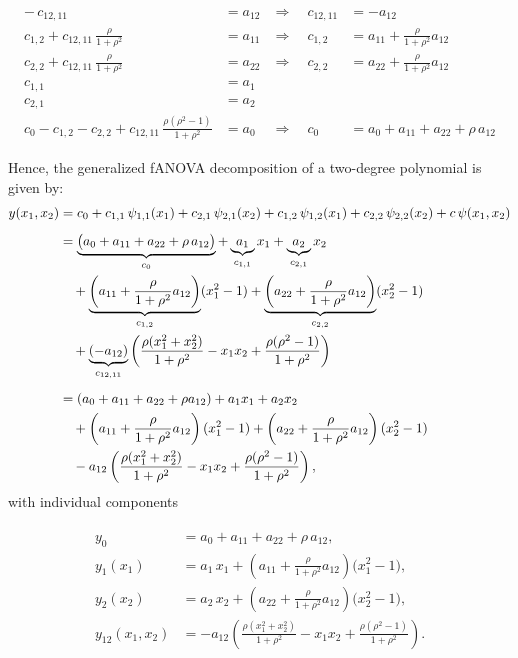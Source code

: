 \begin{align*}
-\,c_{12, 11} &= a_{12} &\Rightarrow\quad c_{12, 11} &= -a_{12} \\[3pt]
c_{1,2} + c_{12, 11}\,\tfrac{\rho}{1+\rho^2} &= a_{11} 
&\Rightarrow\quad c_{1,2} &= a_{11} + \tfrac{\rho}{1+\rho^2}a_{12} \\[3pt]
c_{2,2} + c_{12, 11}\,\tfrac{\rho}{1+\rho^2} &= a_{22} 
&\Rightarrow\quad c_{2,2} &= a_{22} + \tfrac{\rho}{1+\rho^2}a_{12} \\[3pt]
c_{1,1} &= a_1 \\[3pt]
c_{2,1} &= a_2 \\[3pt]
c_0 - c_{1,2} - c_{2,2} + c_{12, 11}\,\tfrac{\rho(\rho^2 - 1)}{1+\rho^2} &= a_0 
&\Rightarrow\quad 
c_0 &= a_0 + a_{11} + a_{22} + \rho\,a_{12}
\end{align*}

Hence, the generalized fANOVA decomposition of a two-degree polynomial is given by:
\begin{align*}
y(x_1,x_2) 
&= c_0 
  + c_{1,1}\,\psi_{1,1}(x_1) 
  + c_{2,1}\,\psi_{2,1}(x_2)
  + c_{1,2}\,\psi_{1,2}(x_1)
  + c_{2,2}\,\psi_{2,2}(x_2)
  + c\,\psi(x_1,x_2) \\[5pt]
&= 
\underbrace{\big(a_0 + a_{11} + a_{22} + \rho\,a_{12}\big)}_{c_0} 
+ \underbrace{a_1}_{c_{1,1}} x_1
+ \underbrace{a_2}_{c_{2,1}} x_2 \\ 
&\quad 
+ \underbrace{\left(a_{11} + \frac{\rho}{1+\rho^2}a_{12}\right)}_{c_{1,2}} (x_1^2 - 1)
+ \underbrace{\left(a_{22} + \frac{\rho}{1+\rho^2}a_{12}\right)}_{c_{2,2}} (x_2^2 - 1) \notag \\
&\quad 
+ \underbrace{(-a_{12})}_{c_{12, 11}}\left(
    \frac{\rho(x_1^2+x_2^2)}{1+\rho^2} - x_1 x_2 
    + \frac{\rho(\rho^2-1)}{1+\rho^2}
  \right) \\[5pt]
&= 
(a_0 + a_{11} + a_{22} + \rho a_{12})
+ a_1 x_1
+ a_2 x_2 \notag \\ 
&\quad 
+ \left(a_{11} + \frac{\rho}{1+\rho^2} a_{12}\right)(x_1^2 - 1)
+ \left(a_{22} + \frac{\rho}{1+\rho^2} a_{12}\right)(x_2^2 - 1) \notag \\
&\quad 
- a_{12}\left(
  \frac{\rho(x_1^2 + x_2^2)}{1+\rho^2}
  - x_1 x_2
  + \frac{\rho(\rho^2 - 1)}{1+\rho^2}
  \right),
\end{align*}
with individual components

\begin{align}
\begin{split}
y_0 &= a_0 + a_{11} + a_{22} + \rho\,a_{12}, \\[3pt]
y_1(x_1) &= a_1\,x_1 
  + \left(a_{11} + \frac{\rho}{1+\rho^2}a_{12}\right)\bigl(x_1^2 - 1\bigr), \\[3pt]
y_2(x_2) &= a_2\,x_2 
  + \left(a_{22} + \frac{\rho}{1+\rho^2}a_{12}\right)\bigl(x_2^2 - 1\bigr), \\[3pt]
y_{12}(x_1,x_2) 
&= -a_{12}\!\left(
    \frac{\rho(x_1^2+x_2^2)}{1+\rho^2} 
    - x_1 x_2 
    + \frac{\rho(\rho^2-1)}{1+\rho^2}
   \right).
\end{split}
\label{eq:fanova_components_2D_polynomial}
\end{align}




